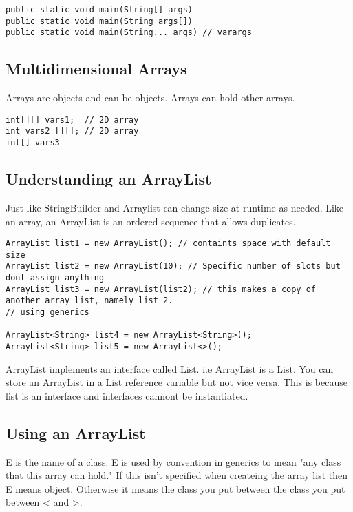\documentclass[a4paper]{report}   %
\begin{document}
\begin{lstlisting}
public static void main(String[] args)
public static void main(String args[])
public static void main(String... args) // varargs
\end{lstlisting}

\subsection{Multidimensional Arrays}

Arrays are objects and can be objects. Arrays can hold other arrays.

\begin{lstlisting}
int[][] vars1;  // 2D array
int vars2 [][]; // 2D array
int[] vars3
\end{lstlisting}

\subsection{Understanding an ArrayList}

Just like StringBuilder and Arraylist can change size at runtime as needed. Like an array, an ArrayList is an ordered sequence that allows duplicates.

\begin{lstlisting}
ArrayList list1 = new ArrayList(); // containts space with default size
ArrayList list2 = new ArrayList(10); // Specific number of slots but dont assign anything
ArrayList list3 = new ArrayList(list2); // this makes a copy of another array list, namely list 2.
// using generics

ArrayList<String> list4 = new ArrayList<String>();
ArrayList<String> list5 = new ArrayList<>();
\end{lstlisting}

ArrayList implements an interface called List. i.e ArrayList is a List. You can store an ArrayList in a List reference variable but not vice versa. This is because list is an interface and interfaces cannont be instantiated.

\subsection{Using an ArrayList}

E is the name of a class. E is used by convention in generics to mean "any class that this array can hold." If this isn't specified when createing the array list then E means object. Otherwise it means the class you put between the class you put between < and >.
\end{document}
